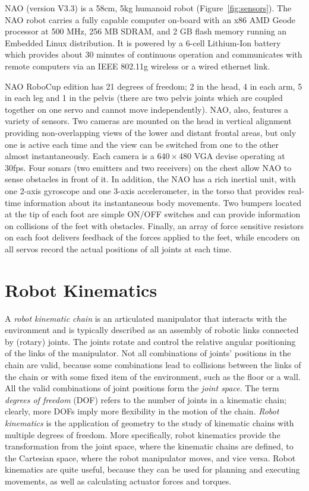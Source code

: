 NAO (version V3.3) is a 58cm, 5kg humanoid robot (Figure~\ref{fig:sensors}). The NAO robot carries a fully capable computer on-board with an x86 AMD Geode processor at 500 MHz, 256 MB SDRAM, and 2 GB flash memory running an Embedded Linux distribution. It is powered by a 6-cell Lithium-Ion battery which provides about 30 minutes of continuous operation and communicates with remote computers via an IEEE 802.11g wireless or a wired ethernet link. 

NAO RoboCup edition has 21 degrees of freedom; 2 in the head, 4 in each arm, 5 in each leg and 1 in the pelvis (there are two pelvis joints which are coupled together on one servo and cannot move independently). NAO, also, features a variety of sensors. Two cameras are mounted on the head in vertical alignment providing non-overlapping views of the lower and distant frontal areas, but only one is active each time and the view can be switched from one to the other almost instantaneously. Each camera is a $640 \times 480$ VGA devise operating at 30fps. Four sonars (two emitters and two receivers) on the chest allow NAO to sense obstacles in front of it. In addition, the NAO has a rich inertial unit, with one 2-axis gyroscope and one 3-axis accelerometer, in the torso that provides real-time information about its instantaneous body movements. Two bumpers located at the tip of each foot are simple ON/OFF switches and can provide information on collisions of the feet with obstacles. Finally, an array of force sensitive resistors on each foot delivers feedback of the forces applied to the feet, while encoders on all servos record the actual positions of all joints at each time.



\section{Robot Kinematics}
A \textit{robot kinematic chain} is an articulated manipulator that interacts with the environment and is typically described as an assembly of robotic links connected by (rotary) joints. The joints rotate and control the relative angular positioning of the links of the manipulator. Not all combinations of joints' positions in the chain are valid, because some combinations lead to collisions between the links of the chain or with some fixed item of the environment, such as the floor or a wall. All the valid combinations of joint positions form the \textit{joint space}. The term \textit{degrees of freedom} (DOF) refers to the number of joints in a kinematic chain; clearly, more DOFs imply more flexibility in the motion of the chain. \textit{Robot kinematics} is the application of geometry to the study of  kinematic chains with multiple degrees of freedom. More specifically, robot kinematics provide the transformation from the joint space, where the kinematic chains are defined, to the Cartesian space, where the robot manipulator moves, and vice versa. Robot kinematics are quite useful, because they can be used for planning and executing movements, as well as calculating actuator forces and torques.



